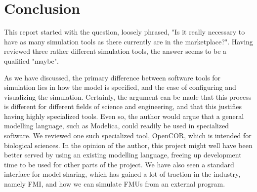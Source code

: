 \documentclass[\rootfolder/main.tex]{subfiles}
\begin{document}
\chapter{Conclusion} %

\label{Chapter06} %

This report started with the question, loosely phrased, "Is it really necessary to have as many simulation tools as there currently are in the marketplace?".
Having reviewed three rather different simulation tools, the answer seems to be a qualified "maybe".

As we have discussed, the primary difference between software tools for simulation lies in how the model is specified, and the ease of configuring and visualizing the simulation.
Certainly, the argument can be made that this process is different for different fields of science and engineering, and that this justifies having highly specialized tools.
Even so, the author would argue that a general modelling language, such as Modelica, could readily be used in specialized software.
We reviewed one such specialized tool, OpenCOR, which is intended for biological sciences.
In the opinion of the author, this project might well have been better served by using an existing modelling language, freeing up development time to be used for other parts of the project.
We have also seen a standard interface for model sharing, which has gained a lot of traction in the industry, namely FMI, and how we can simulate FMUs from an external program.
\end{document}
